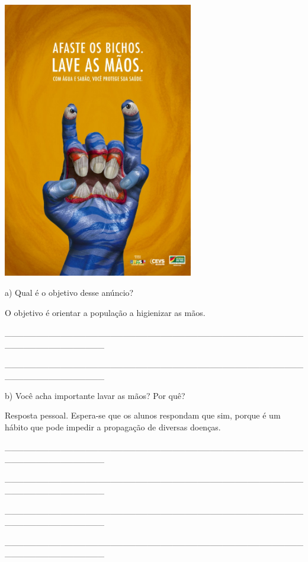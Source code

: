 \includegraphics[width=3.27083in,height=4.76432in]{media/image10.jpeg}

a) Qual é o objetivo desse anúncio?

O objetivo é orientar a população a
higienizar as mãos.

\protect\hypertarget{_Hlk127604103}{}{}\_\_\_\_\_\_\_\_\_\_\_\_\_\_\_\_\_\_\_\_\_\_\_\_\_\_\_\_\_\_\_\_\_\_\_\_\_\_\_\_\_\_\_\_\_\_\_\_\_\_\_\_\_\_\_\_\_\_\_\_\_\_\_\_

\_\_\_\_\_\_\_\_\_\_\_\_\_\_\_\_\_\_\_\_\_\_\_\_\_\_\_\_\_\_\_\_\_\_\_\_\_\_\_\_\_\_\_\_\_\_\_\_\_\_\_\_\_\_\_\_\_\_\_\_\_\_\_\_

b) Você acha importante lavar as mãos? Por quê?

Resposta pessoal. Espera-se que os alunos respondam que sim, porque é um
hábito que pode impedir a propagação de diversas doenças.

\_\_\_\_\_\_\_\_\_\_\_\_\_\_\_\_\_\_\_\_\_\_\_\_\_\_\_\_\_\_\_\_\_\_\_\_\_\_\_\_\_\_\_\_\_\_\_\_\_\_\_\_\_\_\_\_\_\_\_\_\_\_\_\_

\_\_\_\_\_\_\_\_\_\_\_\_\_\_\_\_\_\_\_\_\_\_\_\_\_\_\_\_\_\_\_\_\_\_\_\_\_\_\_\_\_\_\_\_\_\_\_\_\_\_\_\_\_\_\_\_\_\_\_\_\_\_\_\_

\_\_\_\_\_\_\_\_\_\_\_\_\_\_\_\_\_\_\_\_\_\_\_\_\_\_\_\_\_\_\_\_\_\_\_\_\_\_\_\_\_\_\_\_\_\_\_\_\_\_\_\_\_\_\_\_\_\_\_\_\_\_\_\_

\_\_\_\_\_\_\_\_\_\_\_\_\_\_\_\_\_\_\_\_\_\_\_\_\_\_\_\_\_\_\_\_\_\_\_\_\_\_\_\_\_\_\_\_\_\_\_\_\_\_\_\_\_\_\_\_\_\_\_\_\_\_\_\_

